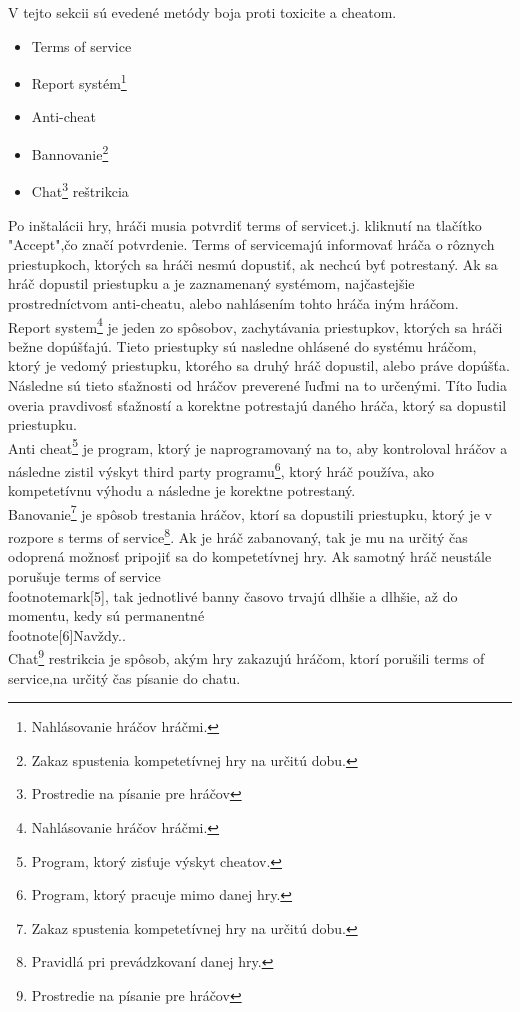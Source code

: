 \documentclass[twoside,twocolumn]{article}
\begin{document}
V tejto sekcii sú evedené metódy boja proti toxicite a cheatom\footnotemark[1].
\begin{itemize}
\item Terms of service\footnotemark[2] 
\item Report systém\footnote[6]{Nahlásovanie hráčov hráčmi.}
\item Anti-cheat\footnotemark[3]
\item Bannovanie\footnote[7]{Zakaz spustenia kompetetívnej hry na určitú dobu.}
\item Chat\footnote[8]{Prostredie na písanie pre hráčov} reštrikcia
\end{itemize}
	Po inštalácii hry, hráči musia potvrdiť terms of service\footnotemark[2]t.j. kliknutí na tlačítko "Accept",čo značí potvrdenie. Terms of service\footnotemark[2] majú informovať hráča o rôznych priestupkoch, ktorých sa hráči nesmú dopustiť, ak nechcú byť potrestaný. Ak sa hráč dopustil priestupku a je zaznamenaný systémom, najčastejšie prostredníctvom anti-cheatu\footnotemark[3], alebo nahlásením tohto hráča iným hráčom.\\
	Report system\footnote[1]{Nahlásovanie hráčov hráčmi.} je jeden zo spôsobov, zachytávania priestupkov, ktorých sa hráči bežne dopúšťajú. Tieto priestupky sú nasledne ohlásené do systému hráčom, ktorý je vedomý priestupku, ktorého sa druhý hráč dopustil, alebo práve dopúšťa. Následne sú tieto sťažnosti od hráčov preverené ľuďmi na to určenými. Títo ľudia overia pravdivosť sťažností a korektne potrestajú daného hráča, ktorý sa dopustil priestupku.\\
	Anti cheat\footnote[2]{Program, ktorý zisťuje výskyt cheatov.} je program, ktorý je naprogramovaný na to, aby kontroloval hráčov a následne zistil výskyt third party programu\footnote[3]{Program, ktorý pracuje mimo danej hry.}, ktorý hráč používa, ako kompetetívnu výhodu a následne je korektne potrestaný.\\
	Banovanie\footnote[4]{Zakaz spustenia kompetetívnej hry na určitú dobu.} je spôsob trestania hráčov, ktorí sa dopustili priestupku, ktorý je v rozpore s terms of service\footnote[5]{Pravidlá pri prevádzkovaní danej hry.}. Ak je hráč zabanovaný\footnotemark[4], tak je mu na určitý čas odoprená možnosť pripojiť sa do kompetetívnej hry. Ak samotný hráč neustále porušuje terms of service\\footnotemark[5], tak jednotlivé banny časovo trvajú dlhšie a dlhšie, až do momentu, kedy sú permanentné\\footnote[6]{Navždy.}.   \\
	Chat\footnote[7]{Prostredie na písanie pre hráčov} restrikcia je spôsob, akým hry zakazujú hráčom, ktorí porušili terms of service\footnotemark[5],na určitý čas písanie do chatu.
\end{document}
